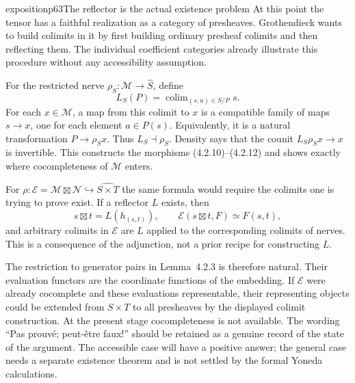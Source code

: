 \begin{dcomment}{exposition}{p63}{The reflector is the actual existence problem}
At this point the tensor has a faithful realization as a category of presheaves. Grothendieck wants to build colimits in it by first building ordinary presheaf colimits and then reflecting them. The individual coefficient categories already illustrate this procedure without any accessibility assumption.

For the restricted nerve $\rho_S:\mathcal M\to\widehat S$, define
\[
 L_S(P)=\mathop{\mathrm{colim}}_{(s,a)\in S/P}s.
\]
For each $x\in\mathcal M$, a map from this colimit to $x$ is a compatible family of maps $s\to x$, one for each element $a\in P(s)$. Equivalently, it is a natural transformation $P\to\rho_Sx$. Thus $L_S\dashv\rho_S$. Density says that the counit $L_S\rho_Sx\to x$ is invertible. This constructs the morphisms (4.2.10)--(4.2.12) and shows exactly where cocompleteness of $\mathcal M$ enters.

For $\rho:\mathcal E=\mathcal M\boxtimes\mathcal N\hookrightarrow\widehat{S\times T}$ the same formula would require the colimits one is trying to prove exist. If a reflector $L$ exists, then
\[
 s\boxtimes t=L(h_{(s,t)}),\qquad
 \mathcal E(s\boxtimes t,F)\simeq F(s,t),
\]
and arbitrary colimits in $\mathcal E$ are $L$ applied to the corresponding colimits of nerves. This is a consequence of the adjunction, not a prior recipe for constructing $L$.

The restriction to generator pairs in Lemma~4.2.3 is therefore natural. Their evaluation functors are the coordinate functions of the embedding. If $\mathcal E$ were already cocomplete and these evaluations representable, their representing objects could be extended from $S\times T$ to all presheaves by the displayed colimit construction. At the present stage cocompleteness is not available. The wording ``Pas prouv\'e; peut-\^etre faux!'' should be retained as a genuine record of the state of the argument. The accessible case will have a positive answer; the general case needs a separate existence theorem and is not settled by the formal Yoneda calculations.
\end{dcomment}

